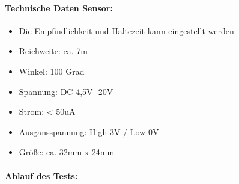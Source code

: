 \paragraph{Technische Daten Sensor:}
\begin{itemize}
\item Die Empfindlichkeit und Haltezeit kann eingestellt werden
\item Reichweite: ca. 7m
\item Winkel: 100 Grad
\item Spannung: DC 4,5V- 20V
\item Strom: < 50uA
\item Ausgansspannung: High 3V / Low 0V
\item Größe: ca. 32mm x 24mm
\end{itemize}

\paragraph{Ablauf des Tests:}
